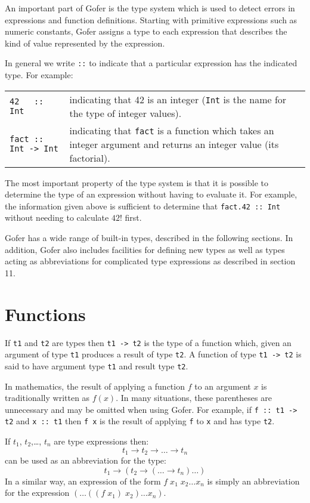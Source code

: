 An important part of Gofer is the type system which is used  to  detect
errors  in  expressions  and  function  definitions.    Starting   with
primitive expressions such as numeric constants, Gofer assigns  a  type
to each expression that describes the kind of value represented by  the
expression.

In  general  we write   \verb"::" 
to indicate  that  a  particular
expression has the indicated type.  For example:
\BQ
\begin{tabular}{lp{8cm}}
    \verb"42   :: Int" &   indicating that  42  is an  integer 
                           (\verb"Int" is the
                            name for the type of integer values).\\
    \verb"fact :: Int -> Int" &  indicating  that  \verb"fact"  
                         is a  function  which
                        takes  an  integer  argument  and  returns   an
                        integer value (its factorial).
\end{tabular}
\EQ
The most important property of the type system is that it  is  possible
to determine the type of an expression without having to  evaluate  it.
For example, the information given above  is  sufficient  to  determine
that \verb"fact.42 :: Int" without needing to calculate $42!$ first.

Gofer has a wide range of built-in types, described  in  the  following
sections.  In addition, Gofer also includes facilities for defining new
types as well as types acting as  abbreviations  for  complicated  type
expressions as described in section 11.


\section{Functions}
If \verb"t1" and \verb"t2" are types then \verb"t1 -> t2" 
is the type of a  function  which,
given an argument of type \verb"t1" produces a result of type \verb"t2".
A  function
of type \verb"t1 -> t2" is said to have argument type \verb"t1"
and result type \verb"t2".

In mathematics, the result of applying a function $f$ to an argument $x$ is
traditionally written as $f(x)$.  In many situations,  these  parentheses
are unnecessary and may be omitted when using Gofer.
For example, if \verb"f :: t1 -> t2" and \verb"x :: t1"
then \verb"f x" is the result of applying
\verb"f" to \verb"x" and has type \verb"t2".


If $t_1$, $t_2$,\dots , $t_n$ are type expressions then:
\[
  t_1 \to t_2 \to \dots \to t_n
\]
can be used as an abbreviation for the type:
\[
  t_1 \to (t_2 \to ( \dots \to t_n) \dots ) 
\]
In a similar way, an expression of the form 
$f\; x_1\; x_2 \dots x_n$ is simply an
abbreviation for the expression 
$(\dots ((f\; x_1)\; x_2) \dots x_n)$.

